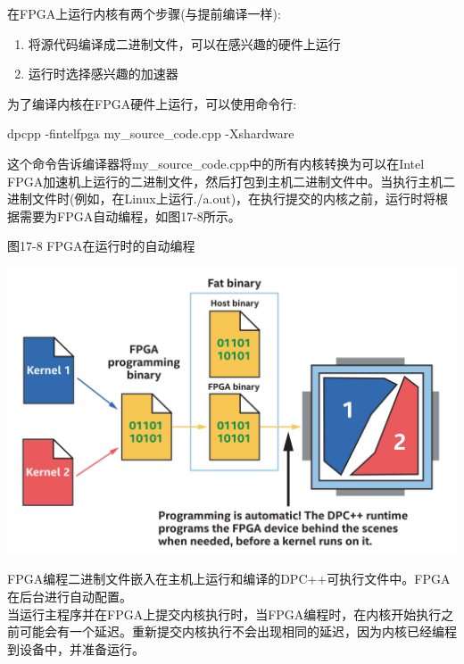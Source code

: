 在FPGA上运行内核有两个步骤(与提前编译一样):\par

\begin{enumerate}
	\item 将源代码编译成二进制文件，可以在感兴趣的硬件上运行
	\item 运行时选择感兴趣的加速器
\end{enumerate}

为了编译内核在FPGA硬件上运行，可以使用命令行:\par

\begin{tcolorbox}[colback=white,colframe=black]
dpcpp -fintelfpga my\_source\_code.cpp -Xshardware
\end{tcolorbox}

这个命令告诉编译器将my\_source\_code.cpp中的所有内核转换为可以在Intel FPGA加速机上运行的二进制文件，然后打包到主机二进制文件中。当执行主机二进制文件时(例如，在Linux上运行./a.out)，在执行提交的内核之前，运行时将根据需要为FPGA自动编程，如图17-8所示。\par

\hspace*{\fill} \par %
图17-8 FPGA在运行时的自动编程
\begin{center}
	\includegraphics[width=1.0\textwidth]{content/chapter-17/images/9}
\end{center}

\begin{tcolorbox}[colback=red!5!white,colframe=red!75!black]
FPGA编程二进制文件嵌入在主机上运行和编译的DPC++可执行文件中。FPGA在后台进行自动配置。\\

当运行主程序并在FPGA上提交内核执行时，当FPGA编程时，在内核开始执行之前可能会有一个延迟。重新提交内核执行不会出现相同的延迟，因为内核已经编程到设备中，并准备运行。
\end{tcolorbox}

